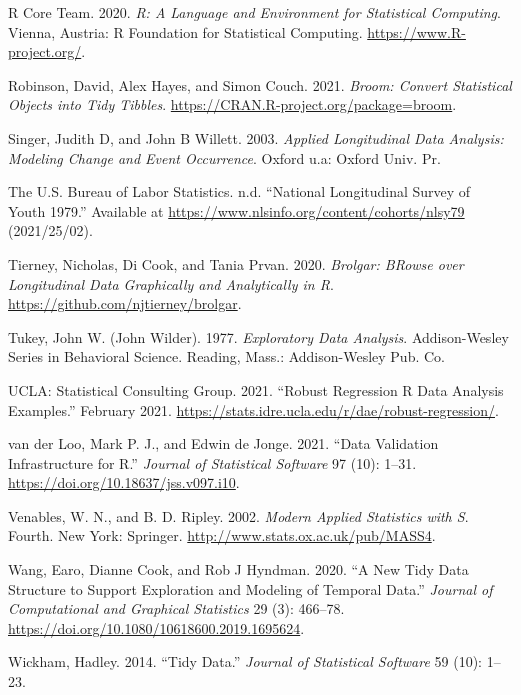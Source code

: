 \documentclass{article}
\begin{document}
\leavevmode\hypertarget{ref-R}{}%
R Core Team. 2020. \emph{R: A Language and Environment for Statistical Computing}. Vienna, Austria: R Foundation for Statistical Computing. \url{https://www.R-project.org/}.

\leavevmode\hypertarget{ref-broom}{}%
Robinson, David, Alex Hayes, and Simon Couch. 2021. \emph{Broom: Convert Statistical Objects into Tidy Tibbles}. \url{https://CRAN.R-project.org/package=broom}.

\leavevmode\hypertarget{ref-SingerJudithD2003Alda}{}%
Singer, Judith D, and John B Willett. 2003. \emph{Applied Longitudinal Data Analysis: Modeling Change and Event Occurrence}. Oxford u.a: Oxford Univ. Pr.

\leavevmode\hypertarget{ref-nlsy79}{}%
The U.S. Bureau of Labor Statistics. n.d. ``National Longitudinal Survey of Youth 1979.'' Available at \url{https://www.nlsinfo.org/content/cohorts/nlsy79} (2021/25/02).

\leavevmode\hypertarget{ref-brolgar}{}%
Tierney, Nicholas, Di Cook, and Tania Prvan. 2020. \emph{Brolgar: BRowse over Longitudinal Data Graphically and Analytically in R}. \url{https://github.com/njtierney/brolgar}.

\leavevmode\hypertarget{ref-tukey}{}%
Tukey, John W. (John Wilder). 1977. \emph{Exploratory Data Analysis}. Addison-Wesley Series in Behavioral Science. Reading, Mass.: Addison-Wesley Pub. Co.

\leavevmode\hypertarget{ref-rlm}{}%
UCLA: Statistical Consulting Group. 2021. ``Robust Regression \textbar{} R Data Analysis Examples.'' February 2021. \url{https://stats.idre.ucla.edu/r/dae/robust-regression/}.

\leavevmode\hypertarget{ref-validate}{}%
van der Loo, Mark P. J., and Edwin de Jonge. 2021. ``Data Validation Infrastructure for R.'' \emph{Journal of Statistical Software} 97 (10): 1--31. \url{https://doi.org/10.18637/jss.v097.i10}.

\leavevmode\hypertarget{ref-mass}{}%
Venables, W. N., and B. D. Ripley. 2002. \emph{Modern Applied Statistics with S}. Fourth. New York: Springer. \url{http://www.stats.ox.ac.uk/pub/MASS4}.

\leavevmode\hypertarget{ref-tsibble}{}%
Wang, Earo, Dianne Cook, and Rob J Hyndman. 2020. ``A New Tidy Data Structure to Support Exploration and Modeling of Temporal Data.'' \emph{Journal of Computational and Graphical Statistics} 29 (3): 466--78. \url{https://doi.org/10.1080/10618600.2019.1695624}.

\leavevmode\hypertarget{ref-WickhamHadley2014TD}{}%
Wickham, Hadley. 2014. ``Tidy Data.'' \emph{Journal of Statistical Software} 59 (10): 1--23.
\end{document}
